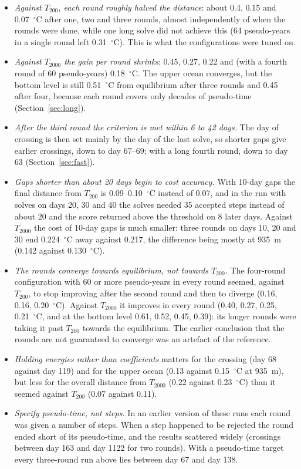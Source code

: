 \documentclass{article}
\begin{document}
\begin{itemize}
\item \emph{Against $T_{200}$, each round roughly halved the distance}: about 0.4, 0.15 and 0.07~$^\circ$C after one, two and three rounds, almost independently of when the rounds were done, while one long solve did not achieve this (64 pseudo-years in a single round left 0.31~$^\circ$C). This is what the configurations were tuned on.
\item \emph{Against $T_{2000}$ the gain per round shrinks}: 0.45, 0.27, 0.22 and (with a fourth round of 60 pseudo-years) 0.18~$^\circ$C. The upper ocean converges, but the bottom level is still 0.51~$^\circ$C from equilibrium after three rounds and 0.45 after four, because each round covers only decades of pseudo-time (Section~\ref{sec:long}).
\item \emph{After the third round the criterion is met within 6 to 42 days.} The day of crossing is then set mainly by the day of the last solve, so shorter gaps give earlier crossings, down to day 67--69; with a long fourth round, down to day 63 (Section~\ref{sec:fast}).
\item \emph{Gaps shorter than about 20 days begin to cost accuracy.} With 10-day gaps the final distance from $T_{200}$ is 0.09--0.10~$^\circ$C instead of 0.07, and in the run with solves on days 20, 30 and 40 the solves needed 35 accepted steps instead of about 20 and the score returned above the threshold on 8 later days. Against $T_{2000}$ the cost of 10-day gaps is much smaller: three rounds on days 10, 20 and 30 end 0.224~$^\circ$C away against 0.217, the difference being mostly at 935~m (0.142 against 0.130~$^\circ$C).
\item \emph{The rounds converge towards equilibrium, not towards $T_{200}$.} The four-round configuration with 60 or more pseudo-years in every round seemed, against $T_{200}$, to stop improving after the second round and then to diverge (0.16, 0.16, 0.20~$^\circ$C). Against $T_{2000}$ it improves in every round (0.40, 0.27, 0.25, 0.21~$^\circ$C, and at the bottom level 0.61, 0.52, 0.45, 0.39): its longer rounds were taking it past $T_{200}$ towards the equilibrium. The earlier conclusion that the rounds are not guaranteed to converge was an artefact of the reference.
\item \emph{Holding energies rather than coefficients} matters for the crossing (day 68 against day 119) and for the upper ocean (0.13 against 0.15~$^\circ$C at 935~m), but less for the overall distance from $T_{2000}$ (0.22 against 0.23~$^\circ$C) than it seemed against $T_{200}$ (0.07 against 0.11).
\item \emph{Specify pseudo-time, not steps.} In an earlier version of these runs each round was given a number of steps. When a step happened to be rejected the round ended short of its pseudo-time, and the results scattered widely (crossings between day 163 and day 1122 for two rounds). With a pseudo-time target every three-round run above lies between day 67 and day 138.
\end{itemize}
\end{document}
